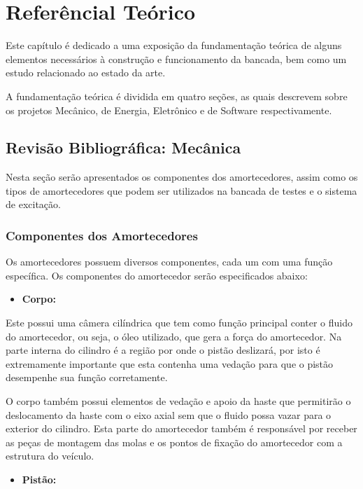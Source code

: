 \chapter{Referêncial Teórico}
\label{chap:referencial}
	
	Este capítulo é dedicado a uma exposição da fundamentação teórica de alguns elementos necessários à construção e funcionamento da bancada, bem como um estudo relacionado ao estado da arte.

	A fundamentação teórica é dividida em quatro seções, as quais descrevem sobre os projetos Mecânico, de Energia, Eletrônico e de Software respectivamente.

	\section{Revisão Bibliográfica: Mecânica}

	Nesta seção serão apresentados os componentes dos amortecedores, assim como os tipos de amortecedores que podem ser utilizados na bancada de testes e o sistema de excitação.

	\subsection{Componentes dos Amortecedores}
		Os amortecedores possuem diversos componentes, cada um com uma função específica. Os componentes do amortecedor serão especificados abaixo:

		\begin{itemize}
			\item \textbf{Corpo:}
		\end{itemize}

		Este possui uma câmera cilíndrica que tem como função principal conter o fluido do amortecedor, ou seja, o óleo utilizado, que gera a força do amortecedor. Na parte interna do cilindro é a região por onde o pistão deslizará, por isto é extremamente importante que esta contenha uma vedação para que o pistão desempenhe sua função corretamente. 


		O corpo também possui elementos de vedação e apoio da haste que permitirão o deslocamento da haste com o eixo axial sem que o fluido possa vazar para o exterior do cilindro. Esta parte do amortecedor também é responsável por receber as peças de montagem das molas e os pontos de fixação do amortecedor com a estrutura do veículo. 
		
		\begin{itemize}
			\item \textbf{Pistão:}
		\end{itemize}


